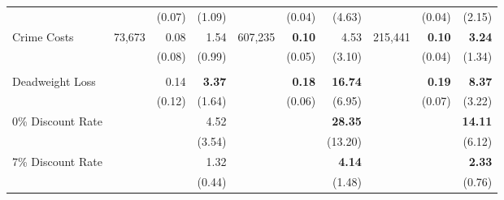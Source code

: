 \begin{tabular}{l r r r r r r r r r}
	&		&	(0.07)	&	(1.09)	&		&	(0.04)	&	(4.63)	&		&	(0.04)	&	(2.15)	\\
Crime Costs	&	73,673	&	0.08	&	1.54	&	607,235	&	\textbf{0.10}	&	4.53	&	215,441	&	\textbf{0.10}	&	\textbf{3.24}	\\
	&		&	(0.08)	&	(0.99)	&		&	(0.05)	&	(3.10)	&		&	(0.04)	&	(1.34)	\\ \\
Deadweight Loss	&		&	0.14	&	\textbf{3.37}	&		&	\textbf{0.18}	&	\textbf{16.74}	&		&	\textbf{0.19}	&	\textbf{8.37}	\\
	&		&	(0.12)	&	(1.64)	&		&	(0.06)	&	(6.95)	&		&	(0.07)	&	(3.22)	\\
0\% Discount Rate	&		&		&	4.52	&		&		&	\textbf{28.35}	&		&		&	\textbf{14.11}	\\
	&		&		&	(3.54)	&		&		&	(13.20)	&		&		&	(6.12)	\\
7\% Discount Rate	&		&		&	1.32	&		&		&	\textbf{4.14}	&		&		&	\textbf{2.33}	\\
	&		&		&	(0.44)	&		&		&	(1.48)	&		&		&	(0.76)	\\
\bottomrule																			
\end{tabular}																			
